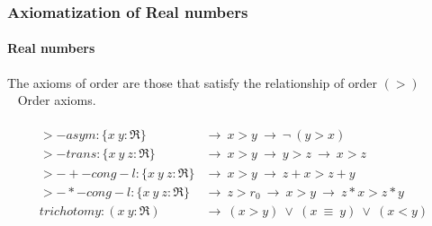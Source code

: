 \documentclass{beamer}
\begin{document}
\begin{frame}
\frametitle{Axiomatization of Real numbers}
\framesubtitle{Real numbers}
{ \rm The axioms of order are those that satisfy the relationship of order $(>)$\\\
}
Order axioms.\\\
\begin{align*}
  >-asym     : \lbrace x\ y    : \Re \rbrace &\to\ x > y ~\to\ \lnot\ (y > x)\\
  >-trans    : \lbrace x\ y\ z : \Re \rbrace &\to\ x > y ~\to\ y > z ~\to\ x > z\\
  >-+-cong-l : \lbrace x\ y\ z : \Re \rbrace & \to\ x > y ~\to\ z + x > z + y\\
  >-*-cong-l : \lbrace x\ y\ z : \Re \rbrace & \to\ z > r_0 ~\to\ x > y ~\to\ z * x > z * y\\
  trichotomy : (x\ y : \Re) & \to\ (x > y) ~\lor\ (x ~\equiv\ y) ~\lor\ (x < y)
\end{align*}

\end{frame}



\end{document}
